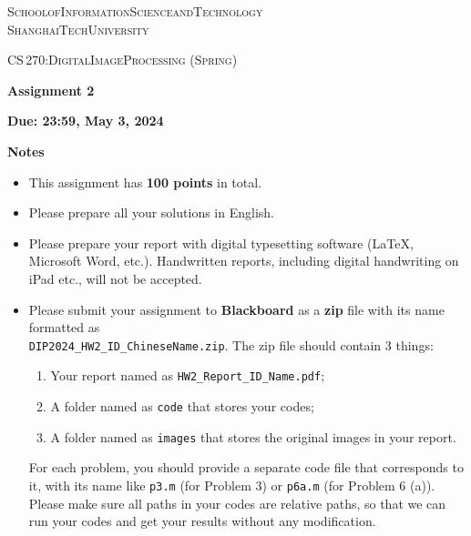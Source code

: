 \documentclass[A4paper, 11pt]{article}
\newcommand{\<}{\,\langle\,}
\renewcommand{\>}{\,\rangle}
\newcommand{\0}{\mathbf{0}}
\newcommand{\1}{\mathbf{1}}
\newcommand{\typeset}{
    \setlength{\parindent}{0pt}
    \setlength{\parskip}{1ex}
    \setlength{\abovedisplayskip}{1ex}
    \setlength{\belowdisplayskip}{1ex}
}
\begin{document}
\begin{spacing}{1.3}

\typeset

\textsc{\large{School\;of\;Information\;Science\;and\;Technology\\[2pt] ShanghaiTech\;University}}

\vspace*{5ex}

\textsc{\large{CS\,270:\;Digital\;Image\;Processing (Spring)}}

\vspace*{2.5ex} \textbf{\huge{Assignment 2}}

\vspace*{1.5ex} \textbf{\large{Due: 23:59, May 3, 2024}}

\vspace*{5ex}

\textbf{\large{Notes}}

\begin{itemize} \setlength{\parskip}{0.5ex} \vspace*{-1ex} 
    \item This assignment has \textbf{100 points} in total.
    \item Please prepare all your solutions in English.
    \item Please prepare your report with digital typesetting software (LaTeX, Microsoft Word, etc.). Handwritten reports, including digital handwriting on iPad etc., will not be accepted.
    \item Please submit your assignment to \textbf{Blackboard} as a \textbf{zip} file with its name formatted as\\ \texttt{DIP2024\_HW2\_ID\_ChineseName.zip}. The zip file should contain 3 things:
    \begin{enumerate}
        \item Your report named as \texttt{HW2\_Report\_ID\_Name.pdf};
        \item A folder named as \texttt{code} that stores your codes;
        \item A folder named as \texttt{images} that stores the original images in your report.
    \end{enumerate}
    For each problem, you should provide a separate code file that corresponds to it, with its name like \texttt{p3.m} (for Problem 3) or \texttt{p6a.m} (for Problem 6 (a)). Please make sure all paths in your codes are relative paths, so that we can run your codes and get your results without any modification.
\end{itemize}


\end{spacing}
\end{document}
